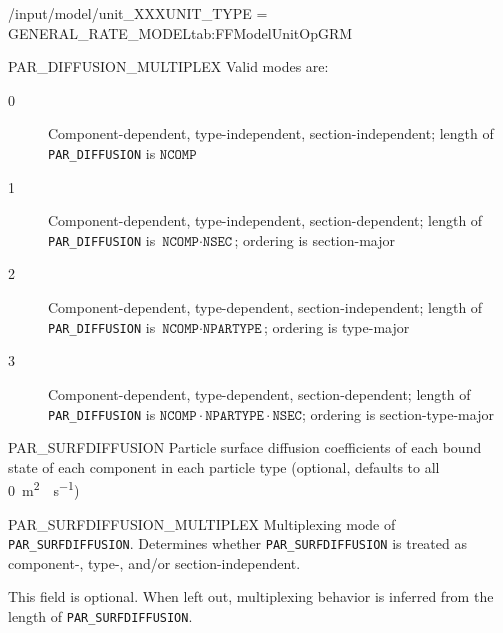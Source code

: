 \begin{condsubgroup}{/input/model/unit\_XXX}{UNIT\_TYPE = GENERAL\_RATE\_MODEL}{tab:FFModelUnitOpGRM}
\begin{dataset}[unit=--,type=int,range={$\{0, \dots, 3 \}$},length={1}]{PAR\_DIFFUSION\_MULTIPLEX}
    Valid modes are:
    \begin{description}
      \item[0] Component-dependent, type-independent, section-independent; length of \texttt{PAR\_DIFFUSION} is $\texttt{NCOMP}$
      \item[1] Component-dependent, type-independent, section-dependent; length of \texttt{PAR\_DIFFUSION} is $\texttt{NCOMP} \cdot \texttt{NSEC}$; ordering is section-major
      \item[2] Component-dependent, type-dependent, section-independent; length of \texttt{PAR\_DIFFUSION} is $\texttt{NCOMP} \cdot \texttt{NPARTYPE}$; ordering is type-major
      \item[3] Component-dependent, type-dependent, section-dependent; length of \texttt{PAR\_DIFFUSION} is $\texttt{NCOMP} \cdot \texttt{NPARTYPE} \cdot \texttt{NSEC}$; ordering is section-type-major
    \end{description}\vspace{-\baselineskip}
  \end{dataset}
  \begin{dataset}[unit=\si{\square\metre\of{SP}\per\second},type=double,range={$\geq 0$},length={see \texttt{PAR\_SURFDIFFUSION\_MULTIPLEX}}]{PAR\_SURFDIFFUSION}
    Particle surface diffusion coefficients of each bound state of each component in each particle type (optional, defaults to all \SI{0}{\square\metre{}\per\second})
  \end{dataset}
  \begin{dataset}[unit=--,type=int,range={$\{0, \dots, 3 \}$},length={1}]{PAR\_SURFDIFFUSION\_MULTIPLEX}
    Multiplexing mode of \texttt{PAR\_SURFDIFFUSION}.
    Determines whether \texttt{PAR\_SURFDIFFUSION} is treated as component-, type-, and/or section-independent.

    This field is optional.
    When left out, multiplexing behavior is inferred from the length of \texttt{PAR\_SURFDIFFUSION}.


\end{dataset}
\end{condsubgroup}
